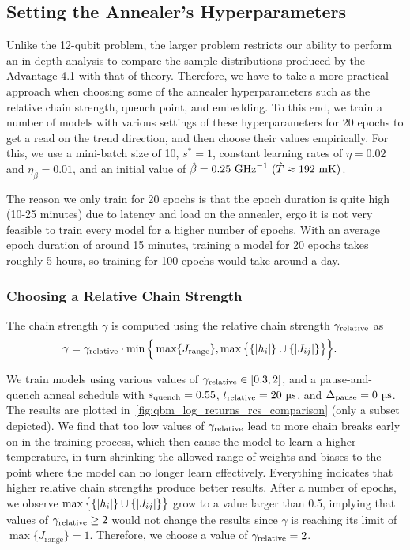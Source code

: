 \subsection{Setting the Annealer's Hyperparameters}\label{sec:qbm_hyperparameters}
Unlike the 12-qubit problem, the larger problem restricts our ability to perform an in-depth analysis to compare the sample distributions produced by the Advantage 4.1 with that of theory.
Therefore, we have to take a more practical approach when choosing some of the annealer hyperparameters such as the relative chain strength, quench point, and embedding.
To this end, we train a number of models with various settings of these hyperparameters for 20 epochs to get a read on the trend direction, and then choose their values empirically.
For this, we use a mini-batch size of 10, \( s^* = 1 \), constant learning rates of \( \eta = 0.02 \) and \( \eta_{\hat{\beta}} = 0.01 \), and an initial value of \( \betahat = 0.25 \ \si{\giga\hertz}^{-1} \ (\hat{T} \approx 192 \ \si{\milli\kelvin}) \).

The reason we only train for 20 epochs is that the epoch duration is quite high (10-25 minutes) due to latency and load on the annealer, ergo it is not very feasible to train every model for a higher number of epochs.
With an average epoch duration of around 15 minutes, training a model for 20 epochs takes roughly 5 hours, so training for 100 epochs would take around a day.

\subsubsection{Choosing a Relative Chain Strength}\label{sec:qbm_rcs}
The chain strength \( \gamma \) is computed using the relative chain strength \( \gamma_{\text{relative}} \) as
\begin{align}
    \gamma
        &= \gamma_{\text{relative}} \cdot \min\Big\{
            \max\{J_\text{range}\}, \max\big\{\{\lvert h_i\rvert\} \cup \{\lvert J_{ij}\rvert\}\big\}
        \Big\}.
\end{align}

We train models using various values of \( \gamma_{\text{relative}} \in [0.3, 2] \), and a pause-and-quench anneal schedule with \( s_{\text{quench}} = 0.55 \), \( t_{\text{relative}} = 20 \ \si{\micro\second} \), and \( \Deltapause = 0 \ \si{\micro\second} \).
The results are plotted in~\cref{fig:qbm_log_returns_rcs_comparison} (only a subset depicted).
We find that too low values of \( \gamma_{\text{relative}} \) lead to more chain breaks early on in the training process, which then cause the model to learn a higher temperature, in turn shrinking the allowed range of weights and biases to the point where the model can no longer learn effectively.
Everything indicates that higher relative chain strengths produce better results.
After a number of epochs, we observe \( \max\big\{ \{\lvert h_i\rvert\} \cup \{\lvert J_{ij}\rvert\} \big\} \) grow to a value larger than 0.5, implying that values of \( \gamma_{\text{relative}} \ge 2 \) would not change the results since \( \gamma \) is reaching its limit of \( \max\{J_\text{range}\} = 1 \).
Therefore, we choose a value of \( \gamma_{\text{relative}} = 2 \).


